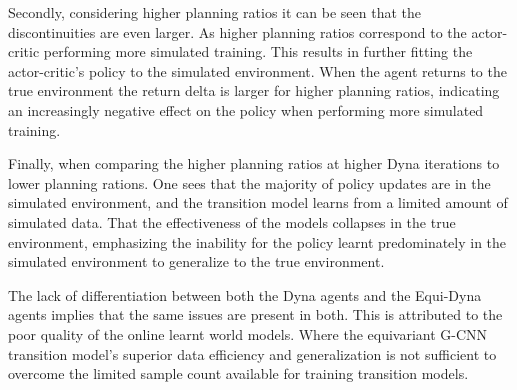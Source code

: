 Secondly, considering higher planning ratios it can be seen that the discontinuities are even larger. As higher planning ratios correspond to the actor-critic performing more simulated training. This results in further fitting the actor-critic's policy to the simulated environment. When the agent returns to the true environment the return delta is larger for higher planning ratios, indicating an increasingly negative effect on the policy when performing more simulated training.

Finally, when comparing the higher planning ratios at higher Dyna iterations to lower planning rations. One sees that the majority of policy updates are in the simulated environment, and the transition model learns from a limited amount of simulated data. That the effectiveness of the models collapses in the true environment, emphasizing the inability for the policy learnt predominately in the simulated environment to generalize to the true environment.

The lack of differentiation between both the Dyna agents and the Equi-Dyna agents implies that the same issues are present in both. This is attributed to the poor quality of the online learnt world models. Where the equivariant G-CNN transition model's superior data efficiency and generalization is not sufficient to overcome the limited sample count available for training transition models.


